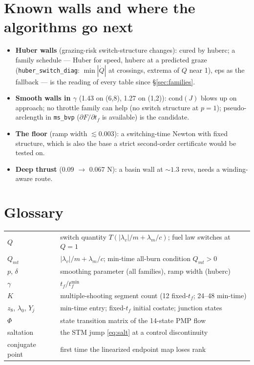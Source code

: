 \documentclass[11pt]{article}
\newcommand{\lv}{\lambda_v}\newcommand{\lr}{\lambda_r}\newcommand{\lm}{\lambda_m}
\newcommand{\tf}{t_f}\newcommand{\R}{\mathbb{R}}
\newcommand{\file}[1]{\texttt{#1}}
\newcommand{\Qmt}{Q_{mt}}
\begin{document}
\section{Known walls and where the algorithms go next}
\begin{itemize}
\item \textbf{Huber walls} (grazing-risk switch-structure changes): cured by
huberc; a family schedule --- Huber for speed, huberc at a predicted graze
(\file{huber\_switch\_diag}: $\min|\dot Q|$ at crossings, extrema of $Q$ near 1),
eps as the fallback --- is the reading of every table since \S\ref{sec:families}.
\item \textbf{Smooth walls in $\gamma$} (1.43 on (6,8), 1.27 on (1,2)): cond$(J)$
blows up on approach; no throttle family can help (no switch structure at
$p=1$); pseudo-arclength in \file{ms\_bvp} ($\partial F/\partial\tf$ is available)
is the candidate.
\item \textbf{The floor} (ramp width $\lesssim0.003$): a switching-time Newton
with fixed structure, which is also the base a strict second-order certificate would be tested on.
\item \textbf{Deep thrust} (0.09 $\to$ 0.067 N): a basin wall at $\sim1.3$ revs,
needs a winding-aware route.
\end{itemize}

\section*{Glossary}
\begin{tabular}{@{}ll@{}}
$Q$ & switch quantity $T(|\lv|/m+\lm/c)$; fuel law switches at $Q=1$ \\
$\Qmt$ & $|\lv|/m+\lm/c$; min-time all-burn condition $\Qmt>0$ \\
$p$, $\delta$ & smoothing parameter (all families), ramp width (huberc) \\
$\gamma$ & $\tf/\tf^{\min}$ \\
$K$ & multiple-shooting segment count (12 fixed-$\tf$; 24--48 min-time) \\
$z_8$, $\lambda_0$, $Y_j$ & min-time entry; fixed-$\tf$ initial costate; junction states \\
$\Phi$ & state transition matrix of the 14-state PMP flow \\
saltation & the STM jump \eqref{eq:salt} at a control discontinuity \\
conjugate point & first time the linearized endpoint map loses rank \\
\end{tabular}
\end{document}

